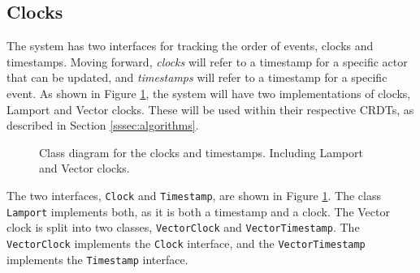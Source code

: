 \documentclass[12pt]{report}
\begin{document}
\subsection{Clocks}
The system has two interfaces for tracking the order of events, clocks and timestamps. Moving forward, \textit{clocks} will refer to a timestamp for a specific actor that can be updated, and \textit{timestamps} will refer to a timestamp for a specific event.  
As shown in Figure \ref{fig:ordered}, the system will have two implementations of clocks, Lamport and Vector clocks. These will be used within their respective CRDTs, as described in Section \ref{sssec:algorithms}. \par

\begin{figure}[h]
    \centering
    \caption{Class diagram for the clocks and timestamps. Including Lamport and Vector clocks.}
    \label{fig:ordered}
\end{figure}  

The two interfaces, \texttt{Clock} and \texttt{Timestamp}, are shown in Figure \ref{fig:ordered}. The class \texttt{Lamport} implements both, as it is both a timestamp and a clock. The Vector clock is split into two classes, \texttt{VectorClock} and \texttt{VectorTimestamp}. The \texttt{VectorClock} implements the \texttt{Clock} interface, and the \texttt{VectorTimestamp} implements the \texttt{Timestamp} interface. \par
\end{document}
